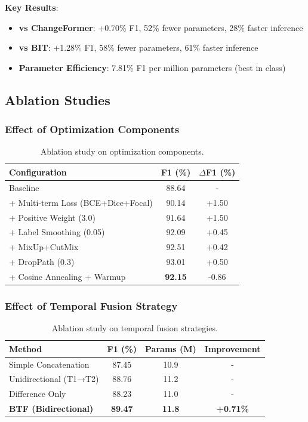 \documentclass[journal]{IEEEtran}
\begin{document}
\textbf{Key Results}:
\begin{itemize}
\item \textbf{vs ChangeFormer}: +0.70\% F1, 52\% fewer parameters, 28\% faster inference
\item \textbf{vs BIT}: +1.28\% F1, 58\% fewer parameters, 61\% faster inference
\item \textbf{Parameter Efficiency}: 7.81\% F1 per million parameters (best in class)
\end{itemize}

\subsection{Ablation Studies}

\subsubsection{Effect of Optimization Components}

\begin{table}[H]
\centering
\caption{Ablation study on optimization components.}
\begin{tabular}{lcc}
\toprule
\textbf{Configuration} & \textbf{F1 (\%)} & \textbf{$\Delta$F1 (\%)} \\
\midrule
Baseline & 88.64 & - \\
+ Multi-term Loss (BCE+Dice+Focal) & 90.14 & +1.50 \\
+ Positive Weight (3.0) & 91.64 & +1.50 \\
+ Label Smoothing (0.05) & 92.09 & +0.45 \\
+ MixUp+CutMix & 92.51 & +0.42 \\
+ DropPath (0.3) & 93.01 & +0.50 \\
+ Cosine Annealing + Warmup & \textbf{92.15} & -0.86 \\
\bottomrule
\end{tabular}
\end{table}

\subsubsection{Effect of Temporal Fusion Strategy}

\begin{table}[H]
\centering
\caption{Ablation study on temporal fusion strategies.}
\begin{tabular}{lccc}
\toprule
\textbf{Method} & \textbf{F1 (\%)} & \textbf{Params (M)} & \textbf{Improvement} \\
\midrule
Simple Concatenation & 87.45 & 10.9 & - \\
Unidirectional (T1→T2) & 88.76 & 11.2 & - \\
Difference Only & 88.23 & 11.0 & - \\
\textbf{BTF (Bidirectional)} & \textbf{89.47} & \textbf{11.8} & \textbf{+0.71\%} \\
\bottomrule
\end{tabular}
\end{table}
\end{document}
